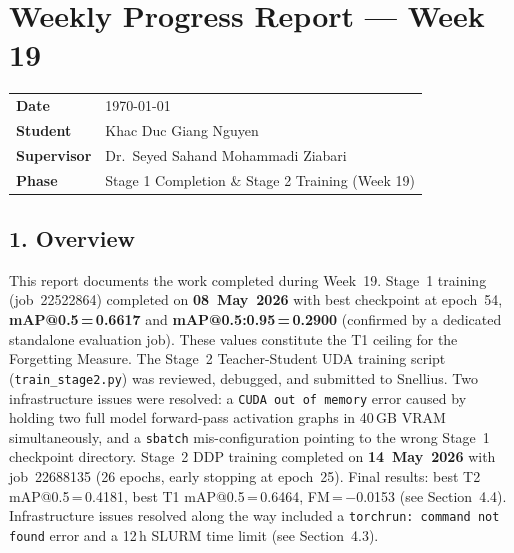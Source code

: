 
\section*{Weekly Progress Report — Week 19}

\begin{tabular}{ll}
    \textbf{Date}       & \today \\
    \textbf{Student}    & Khac Duc Giang Nguyen \\
    \textbf{Supervisor} & Dr.\ Seyed Sahand Mohammadi Ziabari \\
    \textbf{Phase}      & Stage 1 Completion \& Stage 2 Training (Week 19) \\
\end{tabular}

\vspace{1em}

\subsection*{1. Overview}

This report documents the work completed during Week~19.
Stage~1 training (job~22522864) completed on \textbf{08~May~2026}
with best checkpoint at epoch~54, \textbf{mAP@0.5\,=\,0.6617}
and \textbf{mAP@0.5:0.95\,=\,0.2900} (confirmed by a dedicated
standalone evaluation job). These values constitute the T1 ceiling
for the Forgetting Measure. The Stage~2 Teacher-Student UDA training
script (\texttt{train\_stage2.py}) was reviewed, debugged, and
submitted to Snellius. Two infrastructure issues were resolved:
a \texttt{CUDA out of memory} error caused by holding two full
model forward-pass activation graphs in 40\,GB VRAM simultaneously,
and a \texttt{sbatch} mis-configuration pointing to the wrong
Stage~1 checkpoint directory. Stage~2 DDP training completed on \textbf{14~May~2026} with
job~22688135 (26 epochs, early stopping at epoch~25). Final results:
best T2 mAP@0.5\,=\,0.4181, best T1 mAP@0.5\,=\,0.6464,
FM\,=\,$-$0.0153 (see Section~4.4). Infrastructure issues resolved
along the way included a \texttt{torchrun: command not found} error
and a 12\,h SLURM time limit (see Section~4.3).

